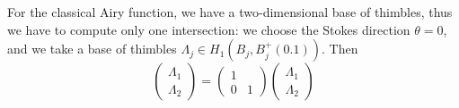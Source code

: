 \documentclass{article}
\theoremstyle{definition}
\theoremstyle{plain}
\begin{document}
For the classical Airy function, we have a two-dimensional base of thimbles, thus we have to compute only one intersection: we choose the Stokes direction $\theta=0$, and we take a base of thimbles $\Lambda_j\in H_1(B_j,B_j^+(0.1))$. Then 
\begin{equation}
    \begin{pmatrix}
        \Lambda_1\\
        \Lambda_2
    \end{pmatrix} = \begin{pmatrix}
        1 & \\
        0 & 1
    \end{pmatrix}\begin{pmatrix}
        \Lambda_1\\
        \Lambda_2
    \end{pmatrix}
\end{equation}
\end{document}
